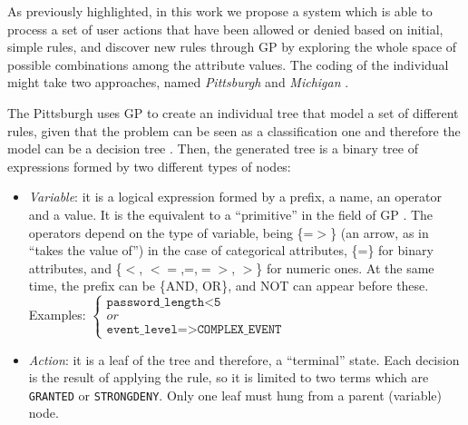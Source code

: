 \documentclass[runningheads]{llncs}
\begin{document}
\label{subsec:solution}

As previously highlighted, in this work we propose a system which is
able to process a set of user actions that have been allowed or denied
based on initial, simple rules, and discover new rules through GP by exploring
the whole space of possible combinations among the attribute
values. The coding of the individual might take two approaches, named \textit{Pittsburgh} and \textit{Michigan}
\cite{freitas2002data}.

The Pittsburgh uses GP to create an individual tree that
model a set of different rules, given that the problem can be seen as
a 
classification one and therefore the model can be a decision tree
\cite{safavian1990survey}. Then, the generated tree is a binary tree
of expressions formed by two different types of nodes:

\begin{itemize}
\item {\em Variable}: it is a logical expression formed by a prefix, a
  name, an operator and a value. It is the equivalent to a
  ``primitive'' in the field of GP \cite{back1996evolutionary}. The
  operators depend on the type of variable, being \{=$>$\} (an arrow, as in ``takes the value of'') in the
  case of categorical attributes, \{=\} for binary attributes, and \{$<$, $<=$,=,$=>$,
  $>$\} for numeric ones. At the same time, the prefix can be \{AND,
  OR\}, and NOT can appear before these. \\ %
    Examples:
   \begin{math}
     \left \{
   \begin{array}{l}
     \texttt{password\_length<5} \\
     or \\
      \texttt{event\_level=>COMPLEX\_EVENT}
   \end{array}
   \right .
   \end{math}
\item {\em Action}: it is a leaf of the tree and therefore, a ``terminal'' state. Each decision is the result of applying the rule, so it is limited to two terms which are \texttt{GRANTED} or \texttt{STRONGDENY}. Only one leaf must hung from a parent (variable) node.
\end{itemize}
\end{document}
